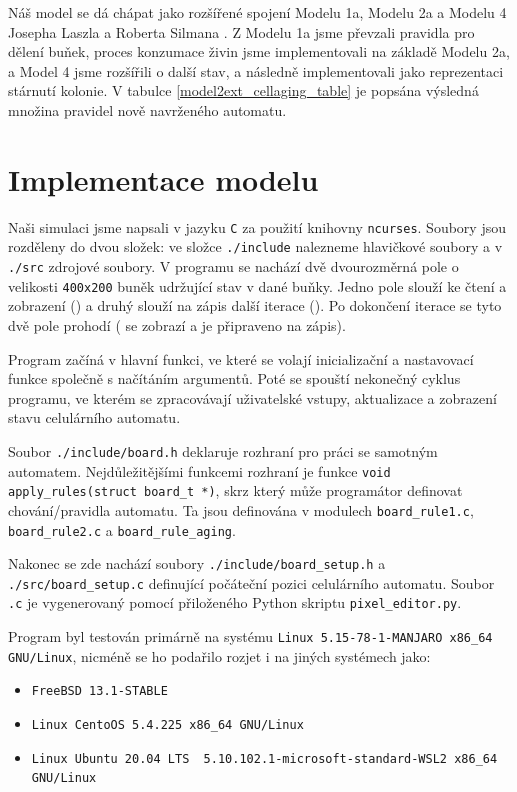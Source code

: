 \documentclass{article}
\begin{document}
Náš model se dá chápat jako rozšířené spojení Modelu 1a, Modelu 2a a Modelu 4 Josepha Laszla a Roberta Silmana \cite{solidSubstrates}.
Z Modelu 1a jsme převzali pravidla pro dělení buňek, proces konzumace živin jsme implementovali na základě Modelu 2a, a Model 4 jsme rozšířili o další stav, a následně implementovali jako reprezentaci stárnutí kolonie. 
V tabulce \ref{model2ext_cellaging_table} je popsána výsledná množina pravidel nově navrženého automatu.


\section{Implementace modelu}
Naši simulaci jsme napsali v jazyku \verb|C| za použití knihovny \verb|ncurses|. Soubory jsou rozděleny do dvou složek: ve složce \verb|./include| nalezneme hlavičkové soubory a v \verb|./src| zdrojové soubory. V programu se nachází dvě dvourozměrná pole o velikosti \verb|400x200| buněk udržující stav v dané buňky. Jedno pole slouží ke čtení a zobrazení () a druhý slouží na zápis další iterace (). Po dokončení iterace se tyto dvě pole prohodí ( se zobrazí a  je připraveno na zápis).

Program začíná v hlavní funkci, ve které se volají inicializační a nastavovací funkce společně s načítáním argumentů. Poté se spouští nekonečný cyklus programu, ve kterém se zpracovávají uživatelské vstupy, aktualizace a zobrazení stavu celulárního automatu.

Soubor \verb|./include/board.h| deklaruje rozhraní pro práci se samotným automatem. Nejdůležitějšími funkcemi rozhraní je funkce \verb|void apply_rules(struct board_t *)|, skrz který může programátor definovat chování/pravidla automatu. Ta jsou definována v modulech \verb|board_rule1.c|, \verb|board_rule2.c| a \verb|board_rule_aging|.

Nakonec se zde nachází soubory \verb|./include/board_setup.h| a \verb|./src/board_setup.c| definující počáteční pozici celulárního automatu. Soubor \verb|.c| je vygenerovaný pomocí přiloženého Python skriptu \verb|pixel_editor.py|.

Program byl testován primárně na systému \verb|Linux 5.15-78-1-MANJARO x86_64 GNU/Linux|, nicméně se ho podařilo rozjet i na jiných systémech jako: 
\begin{itemize}
    \item \verb|FreeBSD 13.1-STABLE|
    \item \verb|Linux CentoOS 5.4.225 x86_64 GNU/Linux|
    \item \verb|Linux Ubuntu 20.04 LTS  5.10.102.1-microsoft-standard-WSL2 x86_64 GNU/Linux|
\end{itemize}
\end{document}
